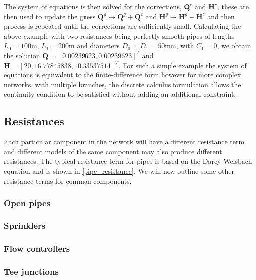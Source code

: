 The system of equations is then solved for the corrections, $\mathbf{Q}^c$ and $\mathbf{H}^c$, these are then used to update the guess $\mathbf{Q}^g \rightarrow \mathbf{Q}^g + \mathbf{Q}^c $ and $\mathbf{H}^g \rightarrow \mathbf{H}^g + \mathbf{H}^c $ and then process is repeated until the corrections are sufficiently small. Calculating the above example with two resistances being perfectly smooth pipes of lengths $L_0 = 100$m, $L_1 = 200$m and diameters $D_0=D_1=50$mm, with $C_1=0$, we obtain the solution $\mathbf{Q} = [0.00239623, 0.00239623]^T$ and $\mathbf{H} = [20, 16.77845838, 10.33537514]^T$. For such a simple example the system of equations is equivalent to the finite-difference form however for more complex networks, with multiple branches, the discrete calculus formulation allows the continuity condition to be satisfied without adding an additional constraint. 

\subsection{Resistances}

Each particular component in the network will have a different resistance term and different models of the same component may also produce different resistances. The typical resistance term for pipes is based on the Darcy-Weisbach equation and is shown in \eqref{pipe_resistance}. We will now outline some other resistance terms for common components. 







\subsubsection{Open pipes}

\subsubsection{Sprinklers}

\subsubsection{Flow controllers}

\subsubsection{Tee junctions}

